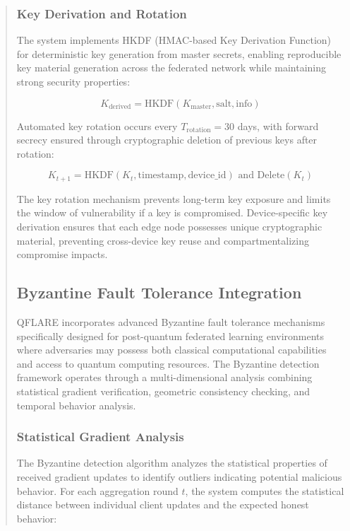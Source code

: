 \documentclass{svproc}
\begin{document}
\begin{abstract}
\subsubsection{Key Derivation and Rotation}

The system implements HKDF (HMAC-based Key Derivation Function) for deterministic key generation from master secrets, enabling reproducible key material generation across the federated network while maintaining strong security properties:

\begin{equation}
K_{\text{derived}} = \text{HKDF}(K_{\text{master}}, \text{salt}, \text{info})
\end{equation}

Automated key rotation occurs every $T_{\text{rotation}} = 30$ days, with forward secrecy ensured through cryptographic deletion of previous keys after rotation:

\begin{equation}
K_{t+1} = \text{HKDF}(K_t, \text{timestamp}, \text{device\_id}) \text{ and } \text{Delete}(K_t)
\end{equation}

The key rotation mechanism prevents long-term key exposure and limits the window of vulnerability if a key is compromised. Device-specific key derivation ensures that each edge node possesses unique cryptographic material, preventing cross-device key reuse and compartmentalizing compromise impacts.

\subsection{Byzantine Fault Tolerance Integration}

QFLARE incorporates advanced Byzantine fault tolerance mechanisms specifically designed for post-quantum federated learning environments where adversaries may possess both classical computational capabilities and access to quantum computing resources. The Byzantine detection framework operates through a multi-dimensional analysis combining statistical gradient verification, geometric consistency checking, and temporal behavior analysis.

\subsubsection{Statistical Gradient Analysis}

The Byzantine detection algorithm analyzes the statistical properties of received gradient updates to identify outliers indicating potential malicious behavior. For each aggregation round $t$, the system computes the statistical distance between individual client updates and the expected honest behavior:


\end{abstract}
\end{document}

